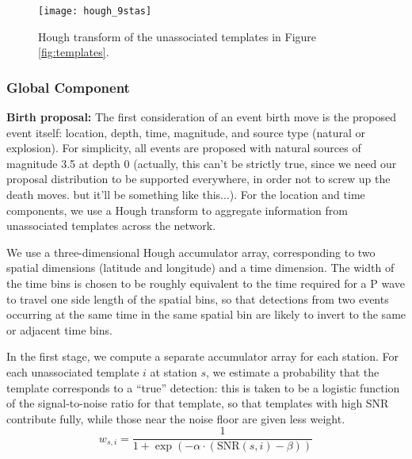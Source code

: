 \documentclass{article}
\begin{document}
\begin{figure}
\texttt{[image: hough\_9stas]}
\caption{Hough transform of the unassociated templates in Figure \ref{fig:templates}.}
\label{fig:hough}

\end{figure}

\subsubsection{Global Component}

{\bf Birth proposal:} The first consideration of an event birth move is the proposed event itself: location, depth, time, magnitude, and source type (natural or explosion). For simplicity, all events are proposed with natural sources of magnitude 3.5 at depth 0 (actually, this can't be strictly true, since we need our proposal distribution to be supported everywhere, in order not to screw up the death moves. but it'll be something like this...). For the location and time components, we use a Hough transform to aggregate information from unassociated templates across the network.

We use a three-dimensional Hough accumulator array, corresponding to two spatial dimensions (latitude and longitude) and a time dimension. The width of the time bins is chosen to be roughly equivalent to the time required for a P wave to travel one side length of the spatial bins, so that detections from two events occurring at the same time in the same spatial bin are likely to invert to the same or adjacent time bins. 

In the first stage, we compute a separate accumulator array for each station. For each unassociated template $i$ at station $s$, we estimate a probability that the template corresponds to a ``true'' detection: this is taken to be a logistic function of the signal-to-noise ratio for that template, so that templates with high SNR contribute fully, while those near the noise floor are given less weight. 
\[w_{s,i} = \frac{1}{1 + \exp(-\alpha \cdot (\text{SNR}(s,i) - \beta))}\]
\end{document}
